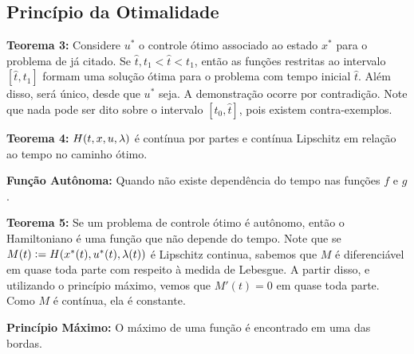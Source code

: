 \subsection{Princípio da Otimalidade}

\textbf{Teorema 3:} Considere $u^*$ o controle ótimo associado ao estado $x^*$ para o problema de já citado. Se $\hat{t}, t_1 < \hat{t} < t_1$, então as funções restritas ao intervalo $[\hat{t},t_1]$ formam uma solução ótima para o problema com tempo inicial $\hat{t}$. Além disso, será único, desde que $u^*$ seja. A demonstração ocorre por contradição. Note que nada pode ser dito sobre o intervalo $[t_0, \hat{t}]$, pois existem contra-exemplos. 

\textbf{Teorema 4:} $H(t,x,u,\lambda)$ é contínua por partes e contínua Lipschitz em relação ao tempo no caminho ótimo.

\textbf{Função Autônoma:} Quando não existe dependência do tempo nas funções $f$ e $g$. 

\textbf{Teorema 5:} Se um problema de controle ótimo é autônomo, então o Hamiltoniano é uma função que não depende do tempo. Note que se $M(t) := H(x^*(t),u^*(t), \lambda(t))$ é Lipschitz continua, sabemos que $M$ é diferenciável em quase toda parte com respeito à medida de Lebesgue. A partir disso, e utilizando o princípio máximo, vemos que $M'(t) = 0$ em quase toda parte. Como $M$ é contínua, ela é constante. 

\textbf{Princípio Máximo: } O máximo de uma função é encontrado em uma das bordas. 